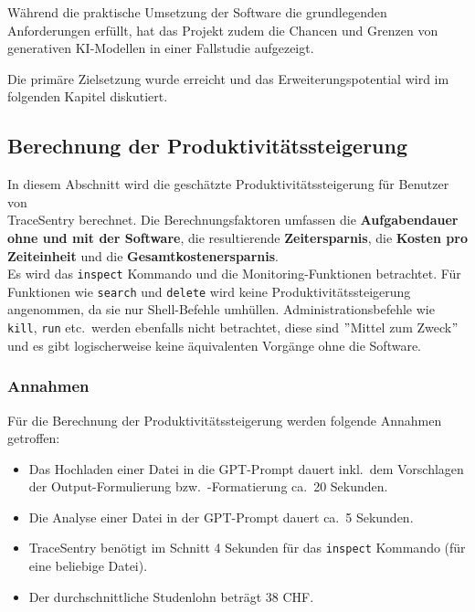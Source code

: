 \documentclass[a4paper,12pt]{report}
\begin{document}
    Während die praktische Umsetzung der Software die grundlegenden Anforderungen erfüllt, hat das Projekt zudem die Chancen und Grenzen von generativen KI-Modellen in einer Fallstudie aufgezeigt.

    Die primäre Zielsetzung wurde erreicht und das Erweiterungspotential wird im folgenden Kapitel diskutiert.

    \subsection{Berechnung der Produktivitätssteigerung}\label{subsec:berechnung-der-produktivitatssteigerung}
    In diesem Abschnitt wird die geschätzte Produktivitätssteigerung für Benutzer von \\TraceSentry berechnet.
    Die Berechnungsfaktoren umfassen die \textbf{Aufgabendauer ohne und mit der Software}, die resultierende  \textbf{Zeitersparnis}, die  \textbf{Kosten pro Zeiteinheit} und die  \textbf{Gesamtkostenersparnis}.
    \\Es wird das \texttt{inspect} Kommando und die Monitoring-Funktionen betrachtet.
    Für Funktionen wie \texttt{search} und \texttt{delete} wird keine Produktivitätssteigerung angenommen, da sie nur Shell-Befehle umhüllen.
    Administrationsbefehle wie \texttt{kill}, \texttt{run} etc.\ werden ebenfalls nicht betrachtet, diese sind \("\)Mittel zum Zweck\("\) und es gibt logischerweise keine äquivalenten Vorgänge ohne die Software.

    \subsubsection{Annahmen}
    Für die Berechnung der Produktivitätssteigerung werden folgende Annahmen getroffen:
    \begin{itemize}
        \item Das Hochladen einer Datei in die GPT-Prompt dauert inkl.\ dem Vorschlagen der Output-Formulierung bzw.\ -Formatierung ca.\ 20 Sekunden.
        \item Die Analyse einer Datei in der GPT-Prompt dauert ca.\ 5 Sekunden.
        \item TraceSentry benötigt im Schnitt 4 Sekunden für das \texttt{inspect} Kommando (für eine beliebige Datei).
        \item Der durchschnittliche Studenlohn beträgt 38 CHF\@.
    \end{itemize}

    \clearpage
\end{document}
